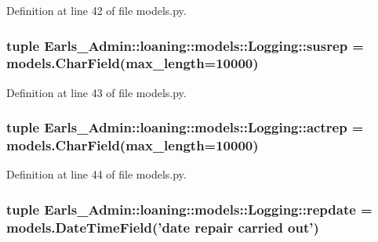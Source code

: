 Definition at line 42 of file models.py.\hypertarget{classEarls__Admin_1_1loaning_1_1models_1_1Logging_c8206aaa16d85867e67d3290e7038371}{
\subsubsection[susrep]{\setlength{\rightskip}{0pt plus 5cm}tuple {\bf Earls\_\-Admin::loaning::models::Logging::susrep} = models.CharField(max\_\-length=10000)}}
\label{classEarls__Admin_1_1loaning_1_1models_1_1Logging_c8206aaa16d85867e67d3290e7038371}




Definition at line 43 of file models.py.\hypertarget{classEarls__Admin_1_1loaning_1_1models_1_1Logging_2379dd94ab713855ffd0520609d7ddee}{
\subsubsection[actrep]{\setlength{\rightskip}{0pt plus 5cm}tuple {\bf Earls\_\-Admin::loaning::models::Logging::actrep} = models.CharField(max\_\-length=10000)}}
\label{classEarls__Admin_1_1loaning_1_1models_1_1Logging_2379dd94ab713855ffd0520609d7ddee}




Definition at line 44 of file models.py.\hypertarget{classEarls__Admin_1_1loaning_1_1models_1_1Logging_f7ea8aac8a3dc2b399022e13bce6eba3}{
\subsubsection[repdate]{\setlength{\rightskip}{0pt plus 5cm}tuple {\bf Earls\_\-Admin::loaning::models::Logging::repdate} = models.DateTimeField('date repair carried out')}}
\label{classEarls__Admin_1_1loaning_1_1models_1_1Logging_f7ea8aac8a3dc2b399022e13bce6eba3}




